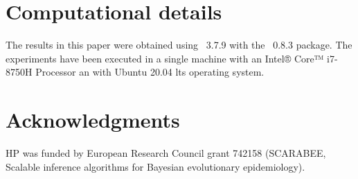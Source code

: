\documentclass[article]{jss}
\begin{document}
\section*{Computational details}
The results in this paper were obtained using ~3.7.9
with the ~0.8.3 package. The experiments have been executed
in a single machine with an Intel® Core™ i7-8750H Processor an with
Ubuntu 20.04 lts operating system.

\section*{Acknowledgments}

HP was funded by European Research Council grant 742158 (SCARABEE,
Scalable inference algorithms for Bayesian evolutionary epidemiology).

\clearpage


\end{document}
